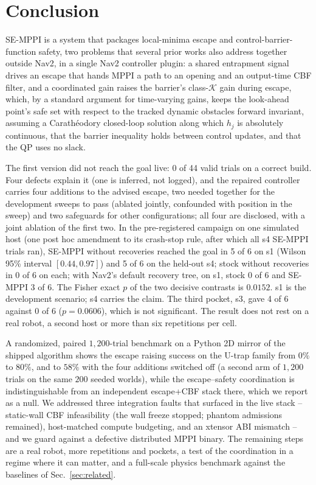 \documentclass[journal]{IEEEtran}
\begin{document}
\section{Conclusion}
\label{sec:conclusion}

SE-MPPI is a system that packages local-minima escape and control-barrier-function safety, two
problems that several prior works also address together outside Nav2, in a single Nav2 controller
plugin: a shared entrapment signal drives an escape that hands MPPI a path to an opening and an
output-time CBF filter, and a coordinated gain raises the barrier's class-$\mathcal{K}$ gain during
escape, which, by a standard argument for time-varying gains, keeps the look-ahead point's safe set with
respect to the tracked dynamic obstacles forward invariant, assuming a Carath\'eodory closed-loop solution along which $h_j$ is absolutely continuous, that the
barrier inequality holds between control updates, and that the QP uses no slack.

The first version did not reach the goal live: 0 of 44 valid trials on a correct build. Four defects
explain it (one is inferred, not logged), and the repaired controller carries four additions to the advised escape, two needed together for the
development sweeps to pass (ablated jointly, confounded with position in the sweep) and two safeguards for other configurations; all four are
disclosed, with a joint ablation of the first two. In the pre-registered campaign on one simulated
host (one post hoc amendment to its crash-stop rule, after which all s4 SE-MPPI trials ran), SE-MPPI without recoveries reached the goal in 5 of 6 on s1 (Wilson 95\% interval $[0.44, 0.97]$)
and 5 of 6 on the held-out s4; stock without recoveries in 0 of 6 on each; with Nav2's default recovery
tree, on s1, stock 0 of 6 and SE-MPPI 3 of 6.
The Fisher exact $p$ of the two decisive contrasts is $0.0152$. s1 is the development scenario;
s4 carries the claim. The third pocket, s3, gave 4 of 6 against 0 of 6 ($p=0.0606$), which is not
significant. The result does not rest on a real robot, a second host or more than six repetitions per cell.

A randomized, paired $1{,}200$-trial benchmark on a Python 2D mirror of the shipped algorithm shows the
escape raising success on the U-trap family from $0\%$ to $80\%$, and to $58\%$ with the four
additions switched off (a second arm of $1{,}200$ trials on the same $200$ seeded worlds), while the escape--safety coordination is indistinguishable from an independent escape+CBF
stack there, which we report as a null. We addressed three integration faults that surfaced in the
live stack -- static-wall CBF infeasibility (the wall freeze stopped; phantom admissions remained),
host-matched compute budgeting, and an xtensor ABI mismatch -- and we guard against a defective
distributed MPPI binary. The remaining steps are a real
robot, more repetitions and pockets, a test of the coordination in a regime where it can matter, and a full-scale
physics benchmark against the baselines of Sec.~\ref{sec:related}.
\end{document}
